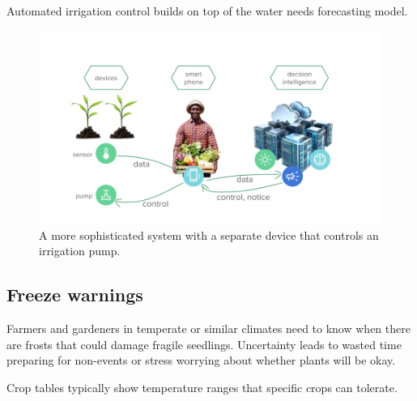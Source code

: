 \documentclass[
]{book}
\begin{document}
Automated irrigation control builds on top of the water needs forecasting model.

\begin{figure}

{\centering \includegraphics[width=13.33in]{images/precision_ag_2} 

}

\caption{A more sophisticated system with a separate device that controls an irrigation pump.}\label{fig:precision-ag-2}
\end{figure}

\hypertarget{freeze-warnings}{%
\subsection{Freeze warnings}\label{freeze-warnings}}

Farmers and gardeners in temperate or similar climates
need to know when there are frosts that could damage fragile seedlings.
Uncertainty leads to wasted time preparing for non-events or
stress worrying about whether plants will be okay.

Crop tables typically show temperature ranges that specific crops can tolerate.
\end{document}
